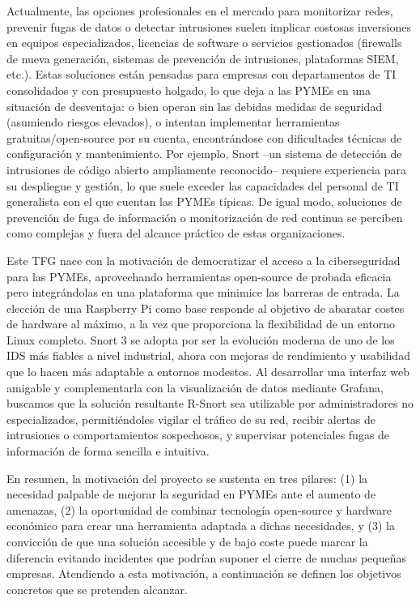 \documentclass[11pt,a4paper,twoside]{report}
\begin{document}
Actualmente, las opciones profesionales en el mercado para monitorizar redes, prevenir fugas de datos o detectar intrusiones suelen implicar costosas inversiones en equipos especializados, licencias de software o servicios gestionados (firewalls de nueva generación, sistemas de prevención de intrusiones, plataformas SIEM, etc.). Estas soluciones están pensadas para empresas con departamentos de TI consolidados y con presupuesto holgado, lo que deja a las PYMEs en una situación de desventaja: o bien operan sin las debidas medidas de seguridad (asumiendo riesgos elevados), o intentan implementar herramientas gratuitas/open-source por su cuenta, encontrándose con dificultades técnicas de configuración y mantenimiento. Por ejemplo, Snort –un sistema de detección de intrusiones de código abierto ampliamente reconocido– requiere experiencia para su despliegue y gestión, lo que suele exceder las capacidades del personal de TI generalista con el que cuentan las PYMEs típicas. De igual modo, soluciones de prevención de fuga de información o monitorización de red continua se perciben como complejas y fuera del alcance práctico de estas organizaciones.\newline

Este TFG nace con la motivación de democratizar el acceso a la ciberseguridad para las PYMEs, aprovechando herramientas open-source de probada eficacia pero integrándolas en una plataforma que minimice las barreras de entrada. La elección de una Raspberry Pi como base responde al objetivo de abaratar costes de hardware al máximo, a la vez que proporciona la flexibilidad de un entorno Linux completo. Snort 3 se adopta por ser la evolución moderna de uno de los IDS más fiables a nivel industrial, ahora con mejoras de rendimiento y usabilidad que lo hacen más adaptable a entornos modestos. Al desarrollar una interfaz web amigable y complementarla con la visualización de datos mediante Grafana, buscamos que la solución resultante R-Snort sea utilizable por administradores no especializados, permitiéndoles vigilar el tráfico de su red, recibir alertas de intrusiones o comportamientos sospechosos, y supervisar potenciales fugas de información de forma sencilla e intuitiva.\newline

En resumen, la motivación del proyecto se sustenta en tres pilares: (1) la necesidad palpable de mejorar la seguridad en PYMEs ante el aumento de amenazas, (2) la oportunidad de combinar tecnología open-source y hardware económico para crear una herramienta adaptada a dichas necesidades, y (3) la convicción de que una solución accesible y de bajo coste puede marcar la diferencia evitando incidentes que podrían suponer el cierre de muchas pequeñas empresas. Atendiendo a esta motivación, a continuación se definen los objetivos concretos que se pretenden alcanzar.
\end{document}
